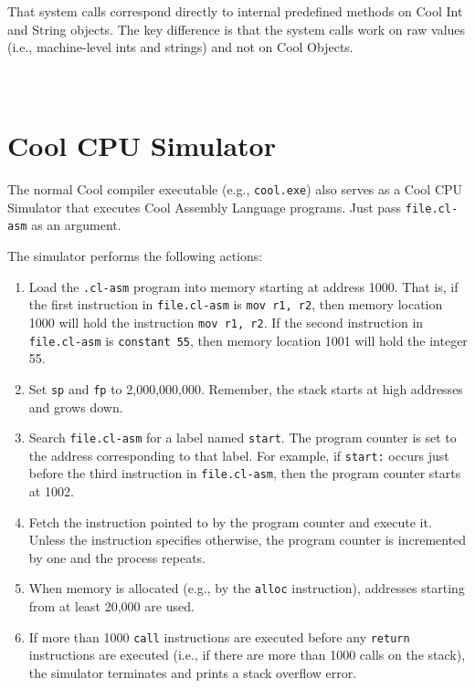 \documentclass[]{article}
\begin{document}
That system calls correspond directly to internal predefined methods on
Cool Int and String objects. The key difference is that the system calls
work on raw values (i.e., machine-level ints and strings) and not on
Cool Objects.

\section{\\ Cool CPU Simulator}

The normal Cool compiler executable (e.g., \texttt{cool.exe}) also
serves as a Cool CPU Simulator that executes Cool Assembly Language
programs. Just pass \texttt{file.cl-asm} as an argument.

The simulator performs the following actions:

\begin{enumerate}
\itemsep1pt\parskip0pt
\item
  Load the \texttt{.cl-asm} program into memory starting at address
  1000. That is, if the first instruction in \texttt{file.cl-asm} is
  \texttt{mov r1, r2}, then memory location 1000 will hold the
  instruction \texttt{mov r1, r2}. If the second instruction in
  \texttt{file.cl-asm} is \texttt{constant 55}, then memory location
  1001 will hold the integer 55.
\item
  Set \texttt{sp} and \texttt{fp} to 2,000,000,000. Remember, the stack
  starts at high addresses and grows down.
\item
  Search \texttt{file.cl-asm} for a label named \texttt{start}. The
  program counter is set to the address corresponding to that label. For
  example, if \texttt{start:} occurs just before the third instruction
  in \texttt{file.cl-asm}, then the program counter starts at 1002.
\item
  Fetch the instruction pointed to by the program counter and execute
  it. Unless the instruction specifies otherwise, the program counter is
  incremented by one and the process repeats.
\item
  When memory is allocated (e.g., by the \texttt{alloc} instruction),
  addresses starting from at least 20,000 are used.
\item
  If more than 1000 \texttt{call} instructions are executed before any
  \texttt{return} instructions are executed (i.e., if there are more
  than 1000 calls on the stack), the simulator terminates and prints a
  stack overflow error.
\end{enumerate}
\end{document}
